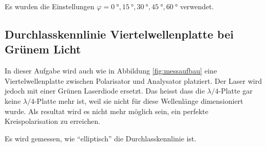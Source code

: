 Es   wurden  die   Einstellungen   $\varphi=\SI{0}{\degree},   \SI{15}{\degree},
\SI{30}{\degree},      \SI{45}{\degree},      \SI{60}{\degree}$       verwendet.


\subsection{Durchlasskennlinie Viertelwellenplatte bei Gr\"unem Licht}

In   dieser  Aufgabe  wird  auch  wie  in  Abbildung  \ref{fig:messaufbau}  eine
Viertelwellenplatte zwischen  Polarisator  und  Analysator  platziert. Der Laser
wird jedoch mit einer Gr\"unen Laserdiode ersetzt.
Das  heisst dass die $\lambda/4$-Platte gar keine $\lambda/4$-Platte  mehr  ist,
weil sie nicht f\"ur diese Wellenl\"ange  dimensioniert wurde. Als resultat wird
es  nicht  mehr  m\"oglich  sein, ein perfekte Kreispolarisation  zu  erreichen.

Es wird gemessen, wie ``elliptisch'' die Durchlasskennlinie ist.
